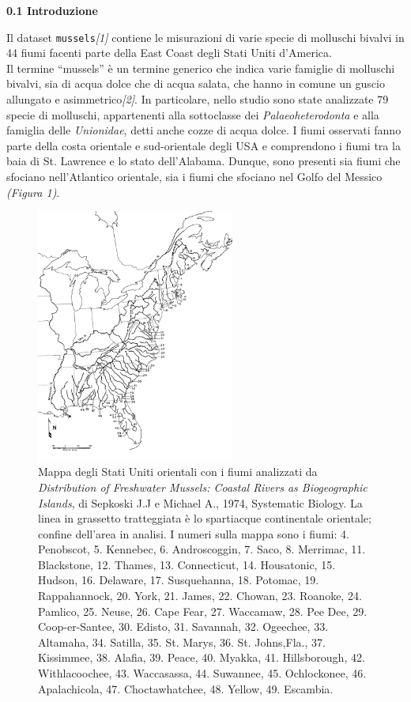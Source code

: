 \documentclass{article} %
\begin{document}
\newpage
\begin{flushleft}
\textbf{\Large 0.1 \: Introduzione}    
\end{flushleft}

Il dataset \texttt{mussels}\textit{[1]} contiene le misurazioni di varie specie di molluschi bivalvi  in 44 fiumi facenti parte della East Coast degli Stati Uniti d'America.\\ 
Il termine “mussels” è un termine generico che indica varie famiglie di molluschi bivalvi, sia di acqua dolce che di acqua salata, che hanno in comune un guscio allungato e asimmetrico\textit{[2]}. In particolare, nello studio sono state analizzate 79 specie di molluschi, appartenenti alla sottoclasse dei \textit{Palaeoheterodonta} e alla famiglia delle \textit{Unionidae}, detti anche cozze di acqua dolce. 
I fiumi osservati fanno parte della costa orientale e sud-orientale degli USA e comprendono i fiumi tra la baia di St. Lawrence e lo stato dell'Alabama. Dunque, sono presenti sia fiumi che sfociano nell'Atlantico orientale, sia i fiumi che sfociano nel Golfo del Messico \textit{(Figura 1)}. 

\begin{figure}[H]
    \centering
    \includegraphics[width=0.58\textwidth]{immagini/usa.png}
    \caption{Mappa degli Stati Uniti orientali con i fiumi analizzati da \textit{Distribution of Freshwater Mussels: Coastal Rivers as Biogeographic Islands}, di Sepkoski J.J e Michael A., 1974, Systematic Biology. La linea in grassetto tratteggiata è lo spartiacque continentale orientale; confine dell'area in analisi. I numeri sulla mappa sono i fiumi: 4. Penobscot, 5. Kennebec, 6. Androscoggin, 7. Saco, 8. Merrimac, 11. Blackstone, 12. Thames, 13. Connecticut, 14. Housatonic, 15. Hudson, 16. Delaware, 17. Susquehanna, 18. Potomac, 19. Rappahannock, 20. York, 21. James, 22. Chowan, 23. Roanoke, 24. Pamlico, 25. Neuse, 26. Cape Fear, 27. Waccamaw, 28. Pee Dee, 29. Coop-er-Santee, 30. Edisto, 31. Savannah, 32. Ogeechee, 33. Altamaha, 34. Satilla, 35. St. Marys, 36. St. Johns,Fla., 37. Kissimmee, 38. Alafia, 39. Peace, 40. Myakka, 41. Hillsborough, 42. Withlacoochee, 43. Waccasassa, 44. Suwannee, 45. Ochlockonee, 46. Apalachicola, 47. Choctawhatchee, 48. Yellow, 49. Escambia.}
\end{figure}
\end{document}
